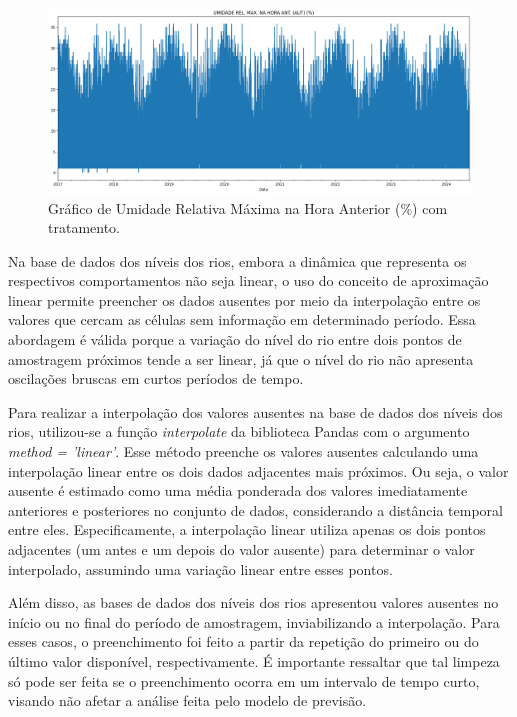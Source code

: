 \begin{figure}[H]
	\caption{\label{fig:dados_outlier_com_tratamento}Gráfico de Umidade Relativa Máxima  na Hora Anterior (\%) com tratamento.}
	\begin{center}
		\includegraphics[scale=0.3]{figuras/UMIDADE REL. MAX. NA HORA ANT. (AUT) COM TRATAMENTO.png}
	\end{center}
\end{figure}

Na base de dados dos níveis dos rios, embora a dinâmica que representa os respectivos comportamentos não seja linear, o uso do conceito de aproximação linear permite preencher os dados ausentes por meio da interpolação entre os valores que cercam as células sem informação em determinado período. Essa abordagem é válida porque a variação do nível do rio entre dois pontos de amostragem próximos tende a ser linear, já que o nível do rio não apresenta oscilações bruscas em curtos períodos de tempo.

Para realizar a interpolação dos valores ausentes na base de dados dos níveis dos rios, utilizou-se a função \textit{interpolate} da biblioteca Pandas com o argumento \textit{method = 'linear'}. Esse método preenche os valores ausentes calculando uma interpolação linear entre os dois dados adjacentes mais próximos. Ou seja, o valor ausente é estimado como uma média ponderada dos valores imediatamente anteriores e posteriores no conjunto de dados, considerando a distância temporal entre eles. Especificamente, a interpolação linear utiliza apenas os dois pontos adjacentes (um antes e um depois do valor ausente) para determinar o valor interpolado, assumindo uma variação linear entre esses pontos.

Além disso, as bases de dados dos níveis dos rios apresentou valores ausentes no início ou no final do período de amostragem, inviabilizando a interpolação. Para esses casos, o preenchimento foi feito a partir da repetição do primeiro ou do último valor disponível, respectivamente. É importante ressaltar que tal limpeza só pode ser feita se o preenchimento ocorra em um intervalo de tempo curto, visando não afetar a análise feita pelo modelo de previsão.

